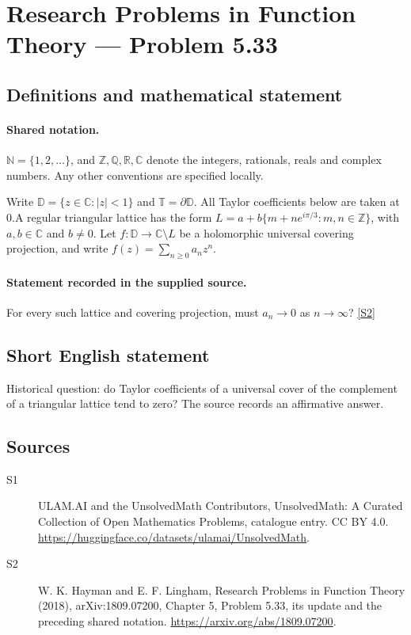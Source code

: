 \documentclass[11pt]{article}
\newcommand{\sref}[2]{\hyperlink{source:#1:#2}{[S#2]}}
\begin{document}
\section{Research Problems in Function Theory — Problem 5.33}\label{statement}

\subsection{Definitions and mathematical statement}

\paragraph{Shared notation.}$\mathbb N=\{1,2,\ldots\}$, and $\mathbb Z,\mathbb Q,\mathbb R,\mathbb C$ denote the integers, rationals, reals and complex numbers. Any other conventions are specified locally.


Write $\mathbb D=\{z\in\mathbb C:|z|<1\}$ and $\mathbb T=\partial\mathbb D$. All Taylor coefficients below are taken at $0$.A regular triangular lattice has the form $L=a+b\{m+n e^{i\pi/3}:m,n\in\mathbb Z\}$, with $a,b\in\mathbb C$ and $b\ne0$. Let $f:\mathbb D\to\mathbb C\setminus L$ be a holomorphic universal covering projection, and write $f(z)=\sum_{n\ge0}a_nz^n$.
\paragraph{Statement recorded in the supplied source.}
For every such lattice and covering projection, must $a_n\to0$ as $n\to\infty$? \sref{statement}{2}
\subsection{Short English statement}
Historical question: do Taylor coefficients of a universal cover of the complement of a triangular lattice tend to zero? The source records an affirmative answer.
\subsection{Sources}
\begin{description}
\item[\hypertarget{source:statement:1}{S1}] ULAM.AI and the UnsolvedMath Contributors, UnsolvedMath: A Curated Collection of Open Mathematics Problems, catalogue entry. CC BY 4.0. \url{https://huggingface.co/datasets/ulamai/UnsolvedMath}.
\item[\hypertarget{source:statement:2}{S2}] W. K. Hayman and E. F. Lingham, Research Problems in Function Theory (2018), arXiv:1809.07200, Chapter 5, Problem 5.33, its update and the preceding shared notation. \url{https://arxiv.org/abs/1809.07200}.
\end{description}
\label{end:statement}
\end{document}
